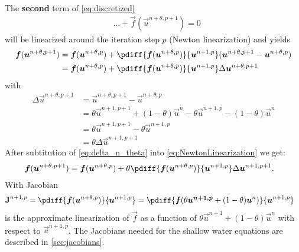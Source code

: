The \textbf{second} term of \autoref{eq:discretized}
\begin{align}
    &\ldots +
    \vec{f} \left( \vec{u}^{n+\theta, p+1} \right) = 0
    \label{eq:second_term}
\end{align}
%
will be linearized around the iteration step $p$ (Newton linearization) and yields
\begin{align}
    \vec{f}( \vec{u}^{n+\theta, p+1} ) & = \vec{f}( \vec{u}^{n+\theta, p} ) + \pdiff{\vec{f}(\vec{u}^{n+\theta,p})}{\vec{u}^{n+1,p}} (\vec{u}^{n+\theta,p+1} - \vec{u}^{n+\theta,p})
    \\
    & = \vec{f}( \vec{u}^{n+\theta, p} ) + \pdiff{\vec{f}(\vec{u}^{n+\theta,p})}{\vec{u}^{n+1,p}} \Delta\vec{u}^{n+\theta,p+1} \label{eq:NewtonLinearization}
\end{align}
with
\begin{align}
    \Delta \vec{u}^{n+\theta, p+1} & = \vec{u}^{n+\theta, p+1} - \vec{u}^{n+\theta, p}
    \\
    & = \theta \vec{u}^{n+1, p+1} + (1-\theta) \vec{u}^{n} - \theta \vec{u}^{n+1, p} - (1-\theta) \vec{u}^{n}
    \\
    & = \theta \vec{u}^{n+1, p+1} - \theta \vec{u}^{n+1, p}
    \\
    &= \theta \Delta \vec{u}^{n+1, p+1} \label{eq:delta_n_theta}
\end{align}
After subtitution of \autoref{eq:delta_n_theta} into \autoref{eq:NewtonLinearization} we get:
\begin{align}
    \vec{f}( \vec{u}^{n+\theta, p+1} ) & = \vec{f}( \vec{u}^{n+\theta, p} ) + \theta \pdiff{\vec{f}(\vec{u}^{n+\theta,p})}{\vec{u}^{n+1,p}} \Delta \vec{u}^{n+1, p+1}.
\end{align}
With Jacobian
\begin{align}
    \mat{J}^{n+1,p} & = \pdiff{\vec{f}(\vec{u}^{n+\theta,p})}{\vec{u}^{n+1,p}}
     = \pdiff{\vec{f}(\theta \vec{u^{n+1,p}} + (1 - \theta) \vec{u}^{n})}{\vec{u}^{n+1,p}}
\end{align}
is the approximate linearization of $\vec{f}$ as a
function of $\theta \vec{u}^{n+1} + (1-\theta)\vec{u}^{n}$ with respect to $\vec{u}^{n+1, p}$.
The Jacobians needed for the shallow water equations are described in \autoref{sec:jacobians}.


